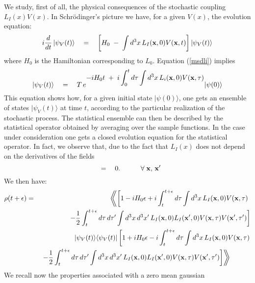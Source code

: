 \documentclass[10pt,a4paper]{article}
\newcommand{\LLangle}{\left\langle\!\!\!\left\langle}
\newcommand{\RRangle}{\right\rangle\!\!\!\right\rangle}
\begin{document}
We study, first of all, the physical consequences of the
stochastic coupling $L_{I}(x) V(x)$. In Schr\"odinger's picture we
have, for a given $V(x)$, the evolution equation:
\begin{equation} \label{msdli}
i\frac{d}{dt}\, |\psi_{V}(t)\rangle \quad = \quad \left[ H_{0} \;
- \; \int d^{3}x\, L_{I}({\bf x}, 0) V({\bf x}, t) \right]
|\psi_{V}(t)\rangle
\end{equation} where $H_{0}$ is the Hamiltonian corresponding to $L_{0}$.
Equation (\ref{msdli}) implies
\begin{equation} \label{cito}
|\psi_{V}(t)\rangle \quad = \quad T\, e^{\displaystyle -i H_{0}t
\; + \; i\int_{0}^{t}d\tau \int d^{3}x\, L_{i}({\bf x}, 0) V({\bf
x}, \tau)} |\psi(0)\rangle
\end{equation}
This equation shows how, for a given initial state
$|\psi(0)\rangle$, one gets an ensemble of states
$|\psi_{V}(t)\rangle$ at time $t$, according to the particular
realization of the stochastic process. The statistical ensemble
can then be described by the statistical operator obtained by
averaging over the sample functions. In the case under
consideration one gets a closed evolution equation for the
statistical operator. In fact, we observe that, due to the fact
that $L_{I}(x)$ does not depend on the derivatives of the fields
\begin{equation}
[L_{I}({\bf x}, 0), L_{I}({\bf x}', 0)] \quad = \quad 0.
\qquad\quad \forall\; {\bf x},\, {\bf x}'
\end{equation}
We then
have:
\begin{eqnarray} \label{mcl}
\rho(t+\epsilon) & = & \LLangle\left[ 1 - iH_{0}\epsilon + i
\int_{t}^{t+\epsilon} d\tau \int d^{3} x\, L_{I}({\bf x}, 0)
V({\bf x}, \tau) \right.\right.\right. \nonumber \\
& & \left. -\frac{1}{2}\int_{t}^{t+\epsilon} d\tau \, d\tau' \int
d^{3} x \, d^{3} x'\, L_{I}({\bf x}, 0) L_{I}({\bf x}', 0) V({\bf
x}, \tau) V({\bf x}', \tau') \right]
\nonumber \\
& & |\psi_{V}(t)\rangle\langle\psi_{V}(t)| \left[ 1 +
iH_{0}\epsilon - i \int_{t}^{t+\epsilon} d\tau \int d^{3} x\,
L_{I}({\bf x}, 0) V({\bf x}, \tau)  \right. \nonumber \\
& & \left.\left.\left. -\frac{1}{2}\int_{t}^{t+\epsilon} d\tau\,
d\tau' \int d^{3} x \, d^{3} x'\, L_{I}({\bf x}, 0) L_{I}({\bf
x}', 0) V({\bf x}, \tau) V({\bf x}', \tau') \right] \RRangle
\quad\qquad
\end{eqnarray}
We recall now the properties associated with a zero mean gaussian
\end{document}
